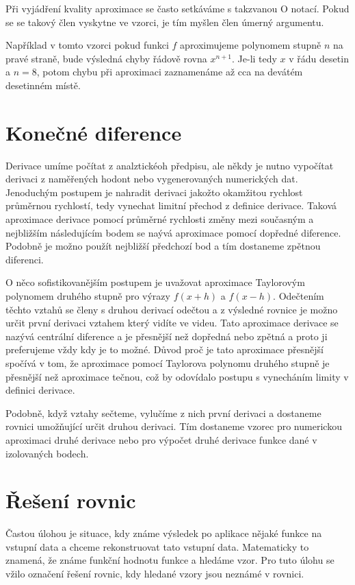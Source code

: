 \documentclass[12pt]{article}
\begin{document}
Při vyjádření kvality aproximace se často setkáváme s takzvanou O notací. Pokud se se takový člen vyskytne ve vzorci, je tím myšlen člen úmerný argumentu.

Například v tomto vzorci pokud funkci $f$ aproximujeme polynomem stupně $n$ na pravé straně, bude výsledná chyby řádově rovna $x^{n+1}$. Je-li tedy $x$ v řádu desetin a $n=8$, potom chybu při aproximaci zaznamenáme až cca na devátém desetinném místě.


\section*{Konečné diference}

Derivace umíme počítat z analztickéoh předpisu, ale někdy je nutno vypočítat derivaci z naměřených hodont nebo vygenerovaných numerických dat. Jenoduchým postupem je nahradit derivaci jakožto okamžitou rychlost průměrnou rychlostí, tedy vynechat limitní přechod z definice derivace. Taková aproximace derivace pomocí průměrné rychlosti změny mezi současným a nejbližším následujícím bodem se naývá aproximace pomocí dopředné diference. Podobně je možno použít nejbližší předchozí bod a tím dostaneme zpětnou diferenci.

O něco sofistikovanějším postupem je uvažovat aproximace Taylorovým polynomem druhého stupně pro výrazy $f(x+h)$ a $f(x-h)$. Odečtením těchto vztahů se členy s druhou derivací odečtou a z výsledné rovnice je možno určit první derivaci vztahem který vidíte ve videu. Tato aproximace derivace se nazývá centrální diference a je přesnější než dopředná nebo zpětná a proto ji preferujeme vždy kdy je to možné. Důvod proč je tato aproximace přesnější spočívá v tom, že aproximace pomocí Taylorova polynomu druhého stupně je přesnější než aproximace tečnou, což by odovídalo postupu s vynecháním limity v definici derivace.

Podobně, když vztahy sečteme, vylučíme z nich první derivaci a dostaneme rovnici umožňující určit druhou derivaci. Tím dostaneme vzorec pro numerickou aproximaci druhé derivace nebo pro výpočet druhé derivace funkce dané v izolovaných bodech.

\section*{Řešení rovnic}

Častou úlohou je situace, kdy známe výsledek po aplikace nějaké funkce na vstupní data a chceme rekonstruovat tato vstupní data. Matematicky to znamená, že známe funkční hodnotu funkce a hledáme vzor. Pro tuto úlohu se vžilo označení řešení rovnic, kdy hledané vzory jsou neznámé v rovnici.
\end{document}
